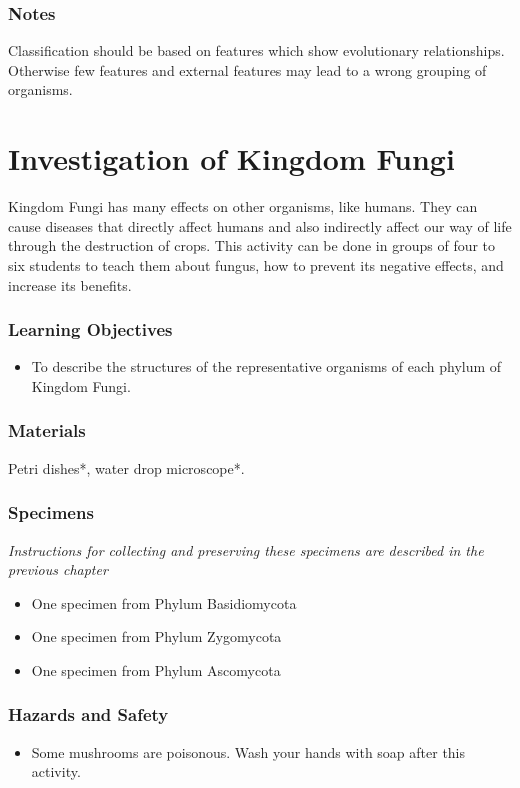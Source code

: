 \subsubsection*{Notes}
Classification should be based on features which show evolutionary relationships. Otherwise few features and external features may lead to a wrong grouping of organisms.


\section{Investigation of Kingdom Fungi}
Kingdom Fungi has many effects on other organisms, like humans.  They can cause diseases that directly affect humans and also indirectly affect our way of life through the destruction of crops.  This activity can be done in groups of four to six students to teach them about fungus, how to prevent its negative effects, and increase its benefits.

\subsubsection*{Learning Objectives}
\begin{itemize}
\item{To describe the structures of the representative organisms of each phylum of Kingdom Fungi.}
\end{itemize}

\subsubsection*{Materials}
Petri dishes*, water drop microscope*.

\subsubsection*{Specimens}
\textit{Instructions for collecting and preserving these specimens are described in the previous chapter}
\begin{itemize}
\item{One specimen from Phylum Basidiomycota}
\item{One specimen from Phylum Zygomycota}
\item{One specimen from Phylum Ascomycota}
\end{itemize}

\subsubsection*{Hazards and Safety}
\begin{itemize}
\item{Some mushrooms are poisonous. Wash your hands with soap after this activity.}
\end{itemize}

